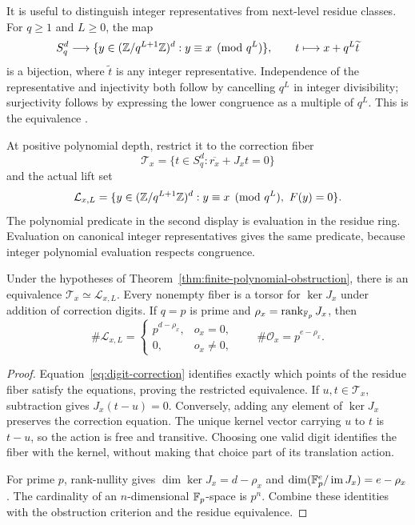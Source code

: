 It is useful to distinguish integer representatives from next-level residue
classes. For $q\ge1$ and $L\ge0$, the map
\[
 S_q^d\longrightarrow
 \{y\in(\mathbb Z/q^{L+1}\mathbb Z)^d:y\equiv x\pmod{q^L}\},
 \qquad t\longmapsto x+q^L\widetilde t
\]
is a bijection, where $\widetilde t$ is any integer representative.
Independence of the representative and injectivity both follow by cancelling
$q^L$ in integer divisibility; surjectivity follows by expressing the lower
congruence as a multiple of $q^L$. This is the equivalence
.

At positive polynomial depth, restrict it to the correction fiber
\[
 \mathcal T_x=\{t\in S_q^d:\overline{r_x}+J_xt=0\}
\]
and the actual lift set
\[
 \mathcal L_{x,L}=
 \{y\in(\mathbb Z/q^{L+1}\mathbb Z)^d:y\equiv x\pmod{q^L},\ F(y)=0\}.
\]
The polynomial predicate in the second display is evaluation in the residue
ring. Evaluation on canonical integer representatives gives the same
predicate, because integer polynomial evaluation respects congruence.

\begin{theorem}\label{thm:lift-torsor-count}
Under the hypotheses of Theorem~\ref{thm:finite-polynomial-obstruction},
there is an equivalence $\mathcal T_x\simeq\mathcal L_{x,L}$.
Every nonempty fiber is a torsor for $\ker J_x$ under addition of
correction digits. If $q=p$ is prime and
$\rho_x=\operatorname{rank}_{\mathbb F_p}J_x$, then
\begin{equation}\label{eq:lift-count}
 \#\mathcal L_{x,L}=
 \begin{cases}p^{d-\rho_x},&o_x=0,\\0,&o_x\ne0,\end{cases}
 \qquad
 \#\mathcal O_x=p^{e-\rho_x}.
\end{equation}
\end{theorem}

\begin{proof}
Equation~\eqref{eq:digit-correction} identifies exactly which points of the
residue fiber satisfy the equations, proving the restricted equivalence.
If $u,t\in\mathcal T_x$, subtraction gives $J_x(t-u)=0$. Conversely,
adding any element of $\ker J_x$ preserves the correction equation. The
unique kernel vector carrying $u$ to $t$ is $t-u$, so the action is free
and transitive. Choosing one valid digit identifies the fiber with the
kernel, without making that choice part of its translation action.

For prime $p$, rank-nullity gives
$\dim\ker J_x=d-\rho_x$ and
$\dim(\mathbb F_p^e/\operatorname{im} J_x)=e-\rho_x$. The cardinality of an
$n$-dimensional $\mathbb F_p$-space is $p^n$. Combine these identities with the
obstruction criterion and the residue equivalence.
\end{proof}

